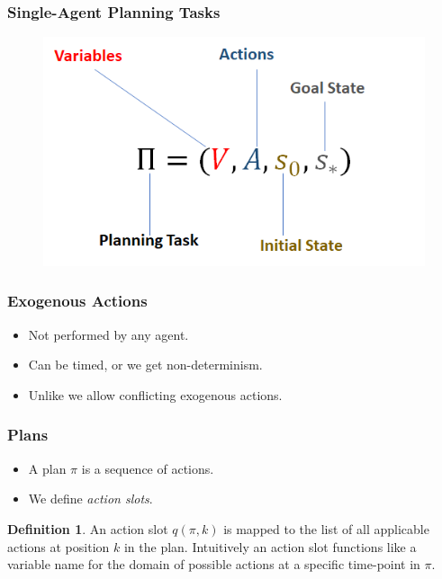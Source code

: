 \documentclass{beamer}
\theoremstyle{plain}
\theoremstyle{definition}
\newtheorem{defn}[thm]{Definition} %
\begin{document}
\begin{frame}
\frametitle{Single-Agent Planning Tasks}
\begin{figure}
\includegraphics[scale=.5]{planningTask}
\end{figure}

\end{frame}


\begin{frame}
\frametitle{Exogenous Actions}
\begin{itemize}
\item Not performed by any agent.
\item Can be timed, or we get non-determinism.
\item Unlike \citet{lind2019ethical} we allow conflicting exogenous actions.
\end{itemize}

\end{frame}


\begin{frame}
\frametitle{Plans}
\begin{itemize}
\item A plan $\pi$ is a sequence of actions. 

\item We define \textit{action slots}. 

\end{itemize}


\begin{defn}
An action slot $q(\pi,k)$ is mapped to the list of all applicable actions at position $k$ in the plan. Intuitively an action slot functions like a variable name for the domain of possible actions at a specific time-point in $\pi$.
\end{defn}

\end{frame}
\end{document}

